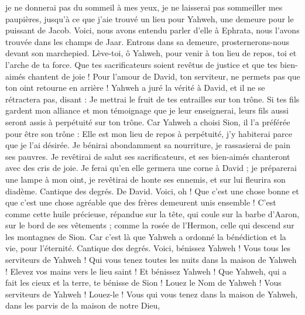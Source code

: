 \begin{multicols}{2}
je ne donnerai pas du sommeil à mes yeux, je ne laisserai pas sommeiller mes paupières,
jusqu’à ce que j'aie trouvé un lieu pour Yahweh, une demeure pour le puissant de Jacob.
Voici, nous avons entendu parler d'elle à Ephrata, nous l'avons trouvée dans les champs de Jaar.
Entrons dans sa demeure, prosternerons-nous devant son marchepied.
Lève-toi, ô Yahweh, pour venir à ton lieu de repos, toi et l'arche de ta force.
Que tes sacrificateurs soient revêtus de justice et que tes bien-aimés chantent de joie !
Pour l'amour de David, ton serviteur, ne permets pas que ton oint retourne en arrière !
Yahweh a juré la vérité à David, et il ne se rétractera pas, disant : Je mettrai le fruit de tes entrailles sur ton trône.
Si tes fils gardent mon alliance et mon témoignage que je leur enseignerai, leurs fils aussi seront assis à perpétuité sur ton trône.
Car Yahweh a choisi Sion, il l'a préférée pour être son trône :
Elle est mon lieu de repos à perpétuité, j'y habiterai parce que je l'ai désirée.
Je bénirai abondamment sa nourriture, je rassasierai de pain ses pauvres.
Je revêtirai de salut ses sacrificateurs, et ses bien-aimés chanteront avec des cris de joie.
Je ferai qu'en elle germera une corne à David ; je préparerai une lampe à mon oint,
je revêtirai de honte ses ennemis, et sur lui fleurira son diadème.
\VerseOne{}Cantique des degrés. De David. Voici, oh ! Que c'est une chose bonne et que c'est une chose agréable que des frères demeurent unis ensemble !
C'est comme cette huile précieuse, répandue sur la tête, qui coule sur la barbe d'Aaron, sur le bord de ses vêtements ;
comme la rosée de l’Hermon, celle qui descend sur les montagnes de Sion. Car c'est là que Yahweh a ordonné la bénédiction et la vie, pour l’éternité.
\VerseOne{}Cantique des degrés. Voici, bénissez Yahweh ! Vous tous les serviteurs de Yahweh ! Qui vous tenez toutes les nuits dans la maison de Yahweh !
Elevez vos mains vers le lieu saint ! Et bénissez Yahweh !
Que Yahweh, qui a fait les cieux et la terre, te bénisse de Sion !
\VerseOne{}Louez le Nom de Yahweh ! Vous serviteurs de Yahweh ! Louez-le !
Vous qui vous tenez dans la maison de Yahweh, dans les parvis de la maison de notre Dieu,

\end{multicols}
